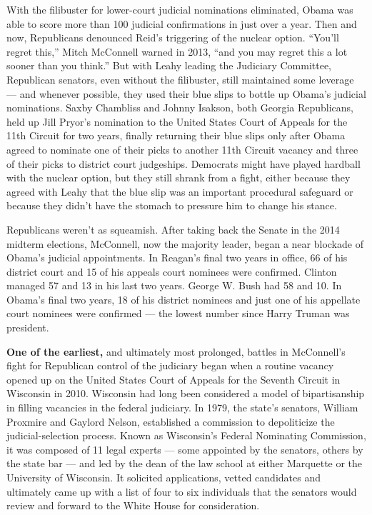 With the filibuster for lower-court judicial nominations eliminated,
Obama was able to score more than 100 judicial confirmations in just
over a year. Then and now, Republicans denounced Reid's triggering of
the nuclear option. ``You'll regret this,'' Mitch McConnell warned in
2013, ``and you may regret this a lot sooner than you think.'' But with
Leahy leading the Judiciary Committee, Republican senators, even without
the filibuster, still maintained some leverage --- and whenever
possible, they used their blue slips to bottle up Obama's judicial
nominations. Saxby Chambliss and Johnny Isakson, both Georgia
Republicans, held up Jill Pryor's nomination to the United States Court
of Appeals for the 11th Circuit for two years, finally returning their
blue slips only after Obama agreed to nominate one of their picks to
another 11th Circuit vacancy and three of their picks to district court
judgeships. Democrats might have played hardball with the nuclear
option, but they still shrank from a fight, either because they agreed
with Leahy that the blue slip was an important procedural safeguard or
because they didn't have the stomach to pressure him to change his
stance.

Republicans weren't as squeamish. After taking back the Senate in the
2014 midterm elections, McConnell, now the majority leader, began a near
blockade of Obama's judicial appointments. In Reagan's final two years
in office, 66 of his district court and 15 of his appeals court nominees
were confirmed. Clinton managed 57 and 13 in his last two years. George
W. Bush had 58 and 10. In Obama's final two years, 18 of his district
nominees and just one of his appellate court nominees were confirmed ---
the lowest number since Harry Truman was president.

\textbf{One of the earliest,} and ultimately most prolonged, battles in
McConnell's fight for Republican control of the judiciary began when a
routine vacancy opened up on the United States Court of Appeals for the
Seventh Circuit in Wisconsin in 2010. Wisconsin had long been considered
a model of bipartisanship in filling vacancies in the federal judiciary.
In 1979, the state's senators, William Proxmire and Gaylord Nelson,
established a commission to depoliticize the judicial-selection process.
Known as Wisconsin's Federal Nominating Commission, it was composed of
11 legal experts --- some appointed by the senators, others by the state
bar --- and led by the dean of the law school at either Marquette or the
University of Wisconsin. It solicited applications, vetted candidates
and ultimately came up with a list of four to six individuals that the
senators would review and forward to the White House for consideration.

